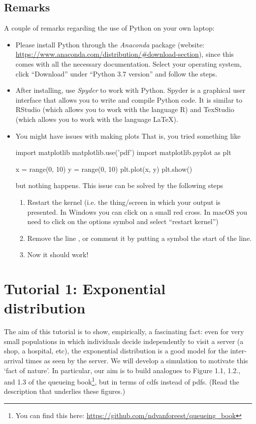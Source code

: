 \subsection*{Remarks}
A couple of remarks regarding the use of Python on your own laptop:
\begin{itemize}
\item Please install Python through the \emph{Anaconda} package (website: \url{https://www.anaconda.com/distribution/#download-section}), since this comes with all the necessary documentation. Select your operating system, click ``Download'' under ``Python 3.7 version'' and follow the steps.
\item After installing, use \emph{Spyder} to work with Python. Spyder is a graphical user interface that allows you to write and compile Python code. It is similar to RStudio (which allows you to work with the language R) and TexStudio (which allows you to work with the language \LaTeX\/). 
\item You might have issues with making plots That is, you tried something like
\begin{pyverbatim}
import matplotlib
matplotlib.use('pdf')
import matplotlib.pyplot as plt

x = range(0, 10)
y = range(0, 10)
plt.plot(x, y)
plt.show()
\end{pyverbatim}
but nothing happens. This issue can be solved by the following steps
\begin{enumerate}
\item Restart the kernel (i.e. the thing/screen in which your output is presented. In Windows you can click on a small red cross. In macOS you need to click on the options symbol and select ``restart kernel'')
\item Remove the line , or comment it by putting a \pyv{#} symbol the start of the line.
\item Now it should work!
\end{enumerate} 
\end{itemize}


\clearpage



\section{Tutorial 1: Exponential distribution}

The aim of this tutorial is to show, empirically, a fascinating fact: even for very small populations in which individuals decide independently to visit a server (a shop, a hospital, etc), the exponential distribution is a good model for the inter-arrival times as seen by the server.
We will develop a simulation to motivate this `fact of nature'.
In particular, our aim is to build analogues to Figure 1.1, 1.2., and 1.3 of the queueing book\footnote{You can find this here: \url{https://github.com/ndvanforeest/queueing_book}}, but in terms of cdfs instead of pdfs.
(Read the description that underlies these figures.)


